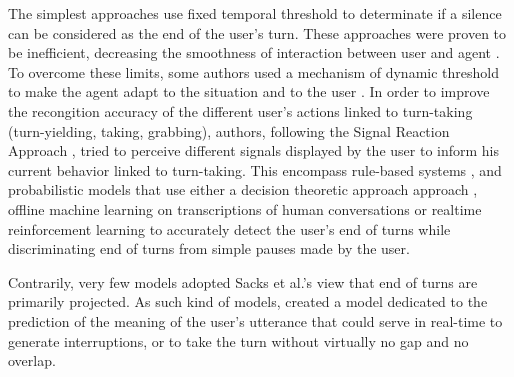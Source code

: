 The simplest approaches use fixed temporal threshold to determinate if a silence can be considered as the end of the user's turn. These approaches were proven to be inefficient, decreasing the
smoothness of interaction between user and agent \citep{ward_root_2005}. To
overcome these limits, some authors used a mechanism
of dynamic threshold to make the agent adapt to the
situation and to the user \citep{bohus_decisions_2011,witt_modeling_2014}. In order to improve the recongition accuracy of the different user's actions linked to turn-taking (turn-yielding, taking, grabbing), authors, following the Signal Reaction Approach \citep{duncan_signals_1972}, tried to perceive different signals displayed by the user to inform his current behavior linked to turn-taking.   
This encompass rule-based systems \citep{cassell_embodiment_1999,thorisson_natural_2002}, and probabilistic
models that use either a decision theoretic approach
approach \citep{bohus_decisions_2011,raux_optimizing_2012}, offline machine learning on transcriptions of human conversations \citep{schlangen_reaction_2006,huang_multimodal_2011} or realtime reinforcement learning \citep{jonsdottir_distributed_2013} to accurately detect the user's end of turns while discriminating end of turns from simple pauses made by the user. 

Contrarily, very few models adopted Sacks et al.'s view that end of turns are primarily projected. As such kind of models, \citep{de_vault_incremental_2011} created a model dedicated to the prediction of the meaning of the user's utterance that could serve in real-time to generate interruptions, or to take the turn without virtually no gap and no overlap.

